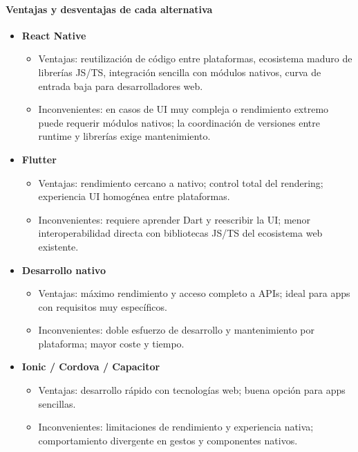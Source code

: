 \documentclass[twoside, openright, 11pt]{report}
\begin{document}
\begin{enumerate}
	\paragraph{Ventajas y desventajas de cada alternativa}
	\begin{itemize}
		\item \textbf{React Native}
		\begin{itemize}
			\item Ventajas: reutilización de código entre plataformas, ecosistema maduro de librerías JS/TS, integración sencilla con módulos nativos, curva de entrada baja para desarrolladores web.
			\item Inconvenientes: en casos de UI muy compleja o rendimiento extremo puede requerir módulos nativos; la coordinación de versiones entre runtime y librerías exige mantenimiento.
		\end{itemize}
		
		\item \textbf{Flutter}
		\begin{itemize}
			\item Ventajas: rendimiento cercano a nativo; control total del rendering; experiencia UI homogénea entre plataformas.
			\item Inconvenientes: requiere aprender Dart y reescribir la UI; menor interoperabilidad directa con bibliotecas JS/TS del ecosistema web existente.
		\end{itemize}
		
		\item \textbf{Desarrollo nativo}
		\begin{itemize}
			\item Ventajas: máximo rendimiento y acceso completo a APIs; ideal para apps con requisitos muy específicos.
			\item Inconvenientes: doble esfuerzo de desarrollo y mantenimiento por plataforma; mayor coste y tiempo.
		\end{itemize}
		
		\item \textbf{Ionic / Cordova / Capacitor}
		\begin{itemize}
			\item Ventajas: desarrollo rápido con tecnologías web; buena opción para apps sencillas.
			\item Inconvenientes: limitaciones de rendimiento y experiencia nativa; comportamiento divergente en gestos y componentes nativos.
		\end{itemize}
	\end{itemize}
	

\end{enumerate}
\end{document}
